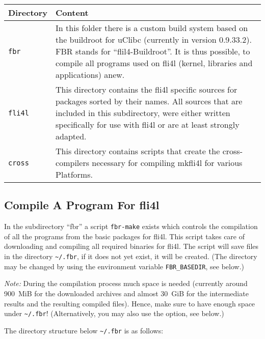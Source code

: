\begin{longtable}{|l|p{10cm}|}
    \hline
    \multicolumn{1}{|l}{\textbf{Directory}} &
    \multicolumn{1}{|l|}{\textbf{Content}} \\
    \hline
    \endhead
    \hline
    \endfoot
    \endlastfoot
\texttt{fbr} &
    In this folder there is a custom build system based on the buildroot for
    uClibc (currently in version 0.9.33.2). FBR stands for ``flil4-Buildroot''.
    It is thus possible, to compile all programs used on fli4l (kernel,
    libraries and applications) anew.\\
\hline
\texttt{fli4l} &
    This directory contains the fli4l specific sources for packages sorted by
    their names. All sources that are included in this subdirectory,
    were either written specifically for use with fli4l or are
    at least strongly adapted. \\
\hline
\texttt{cross} &
    This directory contains scripts that create the cross-compilers
    necessary for compiling mkfli4l for various Platforms. \\
\hline
\end{longtable}

\subsection{Compile A Program For fli4l}

In the subdirectory ``fbr'' a script \texttt{fbr-make} exists which controls
the compilation of all the programs from the basic packages for fli4l. This
script takes care of downloading and compiling all required binaries for fli4l.
The script will save files in the directory \texttt{\~{}/.fbr}, if it does
not yet exist, it will be created.
(The directory may be changed by using the environment variable
\texttt{FBR\_BASEDIR}, see below.)

\emph{Note:} During the compilation process much space is needed (currently around
900~MiB for the downloaded archives and almost 30~GiB for the intermediate results
and the resulting compiled files). Hence, make sure  to have enough space under
\texttt{\~{}/.fbr}!
(Alternatively, you may also use the  option, see below.)

The directory structure below \texttt{\~{}/.fbr} is as follows:

